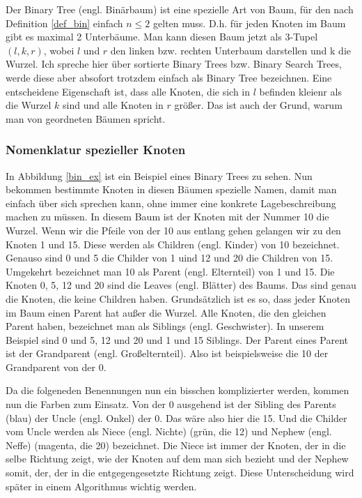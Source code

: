\documentclass[11pt]{article}
\begin{document}
Der Binary Tree (engl. Binärbaum) ist eine spezielle Art von Baum, für den nach Definition \ref{def_bin} einfach $n \leq 2$ gelten muss. D.h. für jeden Knoten im Baum gibt es maximal 2 Unterbäume.
Man kann diesen Baum jetzt als 3-Tupel $(l, k, r)$, wobei $l$ und $r$ den linken bzw. rechten Unterbaum darstellen und k die Wurzel. Ich spreche hier über sortierte Binary Trees bzw. Binary Search Trees, werde diese aber absofort trotzdem einfach als Binary Tree bezeichnen.
Eine entscheidene Eigenschaft ist, dass alle Knoten, die sich in $l$ befinden kleienr als die Wurzel $k$ sind und alle Knoten in $r$ größer.
Das ist auch der Grund, warum man von geordneten Bäumen spricht. 

\subsubsection{Nomenklatur spezieller Knoten}

In Abbildung \ref{bin_ex} ist ein Beispiel eines Binary Trees zu sehen. Nun bekommen bestimmte Knoten in diesen Bäumen spezielle Namen, damit man einfach über sich sprechen kann, ohne immer
eine konkrete Lagebeschreibung machen zu müssen. In diesem Baum ist der Knoten mit der Nummer 10 die Wurzel.
Wenn wir die Pfeile von der 10 aus entlang gehen gelangen wir zu den Knoten 1 und 15. Diese werden als Children (engl. Kinder) von 10 bezeichnet. Genauso sind 0 und 5 die Childer von 1 uind 12 und 20 die Children von 15.
Umgekehrt bezeichnet man 10 als Parent (engl. Elternteil) von 1 und 15. 
Die Knoten 0, 5, 12 und 20 sind die Leaves (engl. Blätter) des Baums. Das sind genau die Knoten, die keine Children haben.
Grundsätzlich ist es so, dass jeder Knoten im Baum einen Parent hat außer die Wurzel.
Alle Knoten, die den gleichen Parent haben, bezeichnet man als Siblings (engl. Geschwister). In unserem Beispiel sind 0 und 5, 12 und 20 und 1 und 15 Siblings. 
Der Parent eines Parent ist der Grandparent (engl. Großelternteil). Also ist beispielsweise die 10 der Grandparent von der 0.
\cite[S.311]{aop}

Da die folgeneden Benennungen nun ein bisschen komplizierter werden, kommen nun die Farben zum Einsatz. Von der 0 ausgehend ist der Sibling des Parents (blau) der Uncle (engl. Onkel) der 0. Das wäre also hier die 15.
Und die Childer vom Uncle werden als Niece (engl. Nichte) (grün, die 12) und Nephew (engl. Neffe) (magenta, die 20) bezeichnet. Die Niece ist immer der Knoten, der in die selbe Richtung zeigt, wie der Knoten auf dem man sich bezieht und der Nephew somit, der, der in die entgegengesetzte Richtung zeigt.
Diese Unterscheidung wird später in einem Algorithmus wichtig werden.
\end{document}
